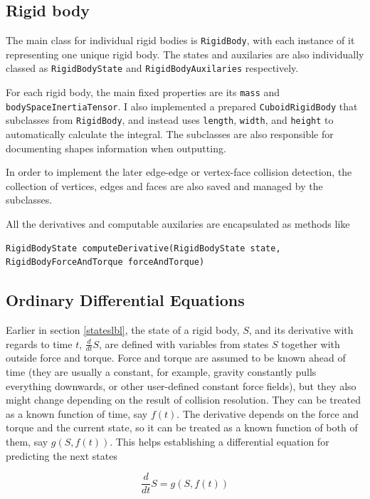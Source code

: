 \documentclass[12pt,a4paper,twoside,openright]{report}
\newcommand{\code}{\texttt}
\begin{document}
\subsection{Rigid body}

The main class for individual rigid bodies is \code{RigidBody}, with each instance of it representing one unique rigid body. The states and auxilaries are also individually classed as \code{RigidBodyState} and \code{RigidBodyAuxilaries} respectively.

For each rigid body, the main fixed properties are its \code{mass} and \code{bodySpaceInertiaTensor}. I also implemented a prepared \code{CuboidRigidBody} that subclasses from \code{RigidBody}, and instead uses \code{length}, \code{width}, and \code{height} to automatically calculate the integral. The subclasses are also responsible for documenting shapes information when outputting.

In order to implement the later edge-edge or vertex-face collision detection, the collection of vertices, edges and faces are also saved and managed by the subclasses.

All the derivatives and computable auxilaries are encapsulated as methods like 

\begin{verbatim}
RigidBodyState computeDerivative(RigidBodyState state, 
RigidBodyForceAndTorque forceAndTorque)
\end{verbatim}

\subsection{Ordinary Differential Equations}\label{odelbl}

Earlier in section \ref{stateslbl}, the state of a rigid body, $S$, and its derivative with regards to time $t$, $\frac{d}{dt}S$, are defined with variables from states $S$ together with outside force and torque. Force and torque are assumed to be known ahead of time (they are usually a constant, for example, gravity constantly pulls everything downwards, or other user-defined constant force fields), but they also might change depending on the result of collision resolution. They can be treated as a known function of time, say $f(t)$. The derivative depends on the force and torque and the current state, so it can be treated as a known function of both of them, say $g(S, f(t))$. This helps establishing a differential equation for predicting the next states

\begin{equation}
\frac{d}{dt}S = g(S, f(t))
\end{equation}
\end{document}
